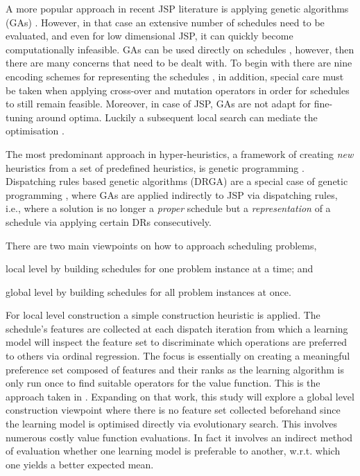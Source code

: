 \documentclass[graybox]{svmult}
\begin{document}
A more popular approach in recent JSP literature is applying genetic algorithms 
(GAs) \cite{Pinedo08}. However, in that case an extensive number of schedules 
need to be evaluated, and even for low dimensional JSP, it can quickly become 
computationally infeasible. GAs can be used directly on schedules 
\cite{Cheng96,Cheng99,Tsai07,Qing-dao-er-ji12,Ak12}, however, then there are 
many concerns that need to be dealt with. To begin with there are nine encoding 
schemes for representing the schedules \cite{Cheng96}, in addition, special 
care must be taken when applying cross-over and mutation operators in order for 
schedules to still remain feasible. Moreover, in case of JSP, GAs are not adapt 
for fine-tuning around optima. Luckily a subsequent local search can mediate 
the optimisation \cite{Cheng99}.

The most predominant approach in hyper-heuristics, a framework of creating 
\emph{new} heuristics from a set of  predefined heuristics, is genetic 
programming \cite{Burke10}. Dispatching rules based genetic algorithms (DRGA) 
\cite{Vazquez-Rodriguez09,Dhingra10,Nguyen13} are a special case of genetic 
programming \cite{Koza05}, where GAs are applied indirectly to JSP via 
dispatching rules, i.e., where a solution is no longer a \emph{proper} schedule 
but a \emph{representation} of a schedule via applying certain DRs 
consecutively. 

There are two main viewpoints on how to approach scheduling problems,
\begin{inparaenum} 
	\item local level by building schedules for one problem instance at a time;
	and \item global level by building schedules for all problem instances at once.
\end{inparaenum}
For local level construction a simple construction heuristic is applied. The 
schedule's features are collected at each dispatch iteration from which a 
learning model will inspect the feature set to discriminate which operations 
are preferred to others via ordinal regression. The focus is essentially on 
creating a meaningful preference set composed of features and their ranks as 
the learning algorithm is only run once to find suitable operators for the 
value function. This is the approach taken in \cite{InRu11a}. Expanding on 
that  work, this study will explore a global level construction viewpoint where 
there is no feature set collected beforehand since the learning model is 
optimised directly via evolutionary search. This involves numerous costly value 
function evaluations. In fact it involves an indirect method of evaluation 
whether one learning model is preferable to another, w.r.t. which one yields a 
better expected mean. 
\end{document}
